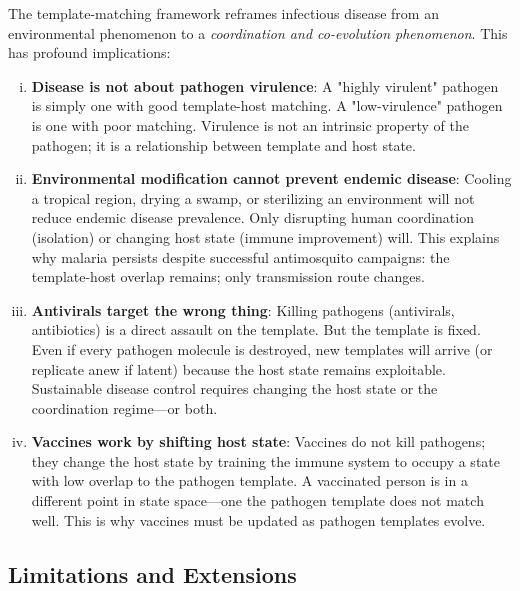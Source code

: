 \documentclass[11pt,twocolumn,a4paper]{article}
\begin{document}
The template-matching framework reframes infectious disease from an environmental phenomenon to a \emph{coordination and co-evolution phenomenon}. This has profound implications:

\begin{enumerate}[(i)]
\item \textbf{Disease is not about pathogen virulence}: A "highly virulent" pathogen is simply one with good template-host matching. A "low-virulence" pathogen is one with poor matching. Virulence is not an intrinsic property of the pathogen; it is a relationship between template and host state.

\item \textbf{Environmental modification cannot prevent endemic disease}: Cooling a tropical region, drying a swamp, or sterilizing an environment will not reduce endemic disease prevalence. Only disrupting human coordination (isolation) or changing host state (immune improvement) will. This explains why malaria persists despite successful antimosquito campaigns: the template-host overlap remains; only transmission route changes.

\item \textbf{Antivirals target the wrong thing}: Killing pathogens (antivirals, antibiotics) is a direct assault on the template. But the template is fixed. Even if every pathogen molecule is destroyed, new templates will arrive (or replicate anew if latent) because the host state remains exploitable. Sustainable disease control requires changing the host state or the coordination regime—or both.

\item \textbf{Vaccines work by shifting host state}: Vaccines do not kill pathogens; they change the host state by training the immune system to occupy a state with low overlap to the pathogen template. A vaccinated person is in a different point in state space—one the pathogen template does not match well. This is why vaccines must be updated as pathogen templates evolve.
\end{enumerate}

\subsection{Limitations and Extensions}
\end{document}
